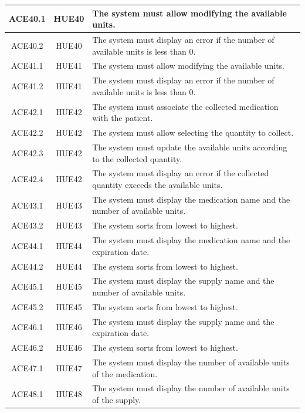 \documentclass{prgrado}
\begin{document}
\begin{longtable}{|c|c|p{9cm}|}
ACE40.1 & HUE40 & The system must allow modifying the available units. \\ \hline
ACE40.2 & HUE40 & The system must display an error if the number of available units is less than 0. \\ \hline

ACE41.1 & HUE41 & The system must allow modifying the available units. \\ \hline
ACE41.2 & HUE41 & The system must display an error if the number of available units is less than 0. \\ \hline

ACE42.1 & HUE42 & The system must associate the collected medication with the patient. \\ \hline
ACE42.2 & HUE42 & The system must allow selecting the quantity to collect. \\ \hline
ACE42.3 & HUE42 & The system must update the available units according to the collected quantity. \\ \hline
ACE42.4 & HUE42 & The system must display an error if the collected quantity exceeds the available units. \\ \hline

ACE43.1 & HUE43 & The system must display the medication name and the number of available units. \\ \hline
ACE43.2 & HUE43 & The system sorts from lowest to highest. \\ \hline

ACE44.1 & HUE44 & The system must display the medication name and the expiration date. \\ \hline
ACE44.2 & HUE44 & The system sorts from lowest to highest. \\ \hline

ACE45.1 & HUE45 & The system must display the supply name and the number of available units. \\ \hline
ACE45.2 & HUE45 & The system sorts from lowest to highest. \\ \hline

ACE46.1 & HUE46 & The system must display the supply name and the expiration date. \\ \hline
ACE46.2 & HUE46 & The system sorts from lowest to highest. \\ \hline

ACE47.1 & HUE47 & The system must display the number of available units of the medication. \\ \hline
ACE48.1 & HUE48 & The system must display the number of available units of the supply. \\ \hline


\end{longtable}
\end{document}
